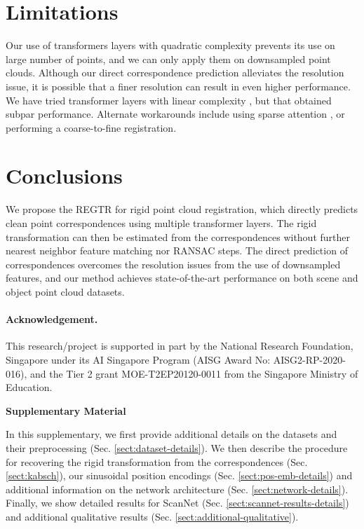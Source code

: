\documentclass[10pt,twocolumn,letterpaper]{article}
\begin{document}
\section{Limitations}
Our use of transformers layers with quadratic complexity prevents its use on large number of points, and we can only apply them on downsampled point clouds. Although our direct correspondence prediction alleviates the resolution issue, it is possible that a finer resolution can result in even higher performance. We have tried transformer layers with linear complexity \cite{katharopoulos2020lineartransformers,choromanski2021performers}, but that obtained subpar performance. Alternate workarounds include using sparse attention \cite{child2019sparsetransformers}, or performing a coarse-to-fine registration.


\section{Conclusions}
We propose the REGTR for rigid point cloud registration, which directly predicts clean point correspondences using multiple transformer layers. The rigid transformation can then be estimated from the correspondences without further nearest neighbor feature matching nor RANSAC steps.
The direct prediction of correspondences overcomes the resolution issues from the use of downsampled features, and our method achieves state-of-the-art performance on both scene and object point cloud datasets.

\vspace{-2mm}
\small
\paragraph{Acknowledgement.}
This research/project is supported in part by the National Research Foundation, Singapore under its AI Singapore Program (AISG Award No: AISG2-RP-2020-016), and the Tier 2 grant MOE-T2EP20120-0011 from the Singapore Ministry of Education.

{\small


}


\clearpage \appendix

{\noindent \large \textbf{Supplementary Material}}

\smallskip \noindent
In this supplementary, we first provide additional details on the datasets and their preprocessing (Sec. \ref{sect:dataset-details}). We then describe the procedure for recovering the rigid transformation from the correspondences (Sec. \ref{sect:kabsch}), our sinusoidal position encodings (Sec. \ref{sect:pos-emb-details}) and additional information on the network architecture (Sec. \ref{sect:network-details}). Finally, we show detailed results for ScanNet (Sec. \ref{sect:scannet-results-details}) and additional qualitative results (Sec. \ref{sect:additional-qualitative}).
\end{document}
